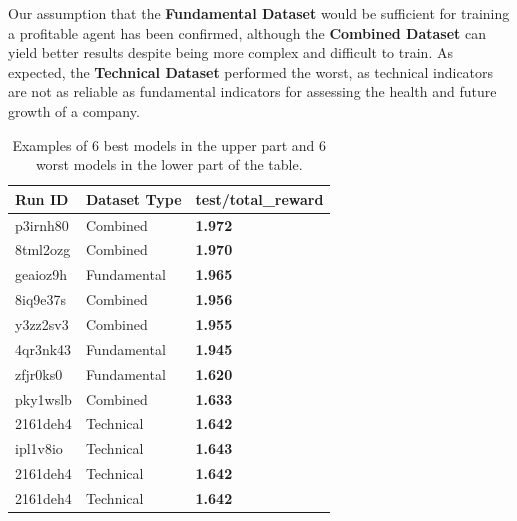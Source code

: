 \documentclass[../xlapes02]{subfiles}
\begin{document}
    Our assumption that the \textbf{Fundamental Dataset} would be sufficient for training a profitable agent has been confirmed, although the \textbf{Combined Dataset} can yield better results despite being more complex and difficult to train. As expected, the \textbf{Technical Dataset} performed the worst, as technical indicators are not as reliable as fundamental indicators for assessing the health and future growth of a company.

    \begin{table}[h!]
        \centering
        \begin{tabular}{|l|l|l|}
            \hline
            \textbf{Run ID} & \textbf{Dataset Type} & \textbf{test/total\_reward}                \\ \hline
            p3irnh80        & Combined              & \textcolor[RGB]{50,150,50}{\textbf{1.972}} \\ \hline
            8tml2ozg        & Combined              & \textcolor[RGB]{50,150,50}{\textbf{1.970}} \\ \hline
            geaioz9h        & Fundamental           & \textcolor[RGB]{50,150,50}{\textbf{1.965}} \\ \hline
            8iq9e37s        & Combined              & \textcolor[RGB]{50,150,50}{\textbf{1.956}} \\ \hline
            y3zz2sv3        & Combined              & \textcolor[RGB]{50,150,50}{\textbf{1.955}} \\ \hline
            4qr3nk43        & Fundamental           & \textcolor[RGB]{50,150,50}{\textbf{1.945}} \\
            \midrule
            \midrule
            zfjr0ks0        & Fundamental           & \textcolor[RGB]{150,50,50}{\textbf{1.620}} \\ \hline
            pky1wslb        & Combined              & \textcolor[RGB]{150,50,50}{\textbf{1.633}} \\ \hline
            2161deh4        & Technical             & \textcolor[RGB]{150,50,50}{\textbf{1.642}} \\ \hline
            ipl1v8io        & Technical             & \textcolor[RGB]{150,50,50}{\textbf{1.643}} \\ \hline
            2161deh4        & Technical             & \textcolor[RGB]{150,50,50}{\textbf{1.642}} \\ \hline
            2161deh4        & Technical             & \textcolor[RGB]{150,50,50}{\textbf{1.642}} \\ \hline
        \end{tabular}
        \caption{Examples of 6 best models in the upper part and 6 worst models in the lower part of the table.}
        \label{tab:datasets-comparison}
    \end{table}
\end{document}
